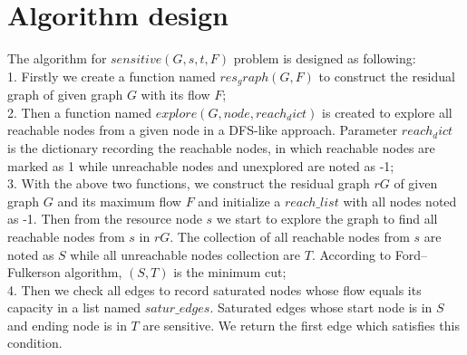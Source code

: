 \documentclass[a4paper,11pt]{article}
\begin{document}
\section{Algorithm design}

The algorithm for $sensitive(G,s,t,F)$ problem is designed as following:  \\
1. Firstly we create a function named $res_graph(G, F)$ to construct the residual graph of given graph $G$ with its flow $F$;\\

2. Then a function named $explore(G, node, reach_dict)$ is created to explore all reachable nodes from a given node in a DFS-like approach. Parameter $reach_dict$ is the dictionary recording the reachable nodes, in which reachable nodes are marked as 1 while unreachable nodes and unexplored are noted as -1;\\

3. With the above two functions, we construct the residual graph $rG$ of given graph $G$ and its maximum flow $F$ and initialize a $reach\_list$ with all nodes noted as -1. Then from the resource node $s$ we start to explore the graph to find all reachable nodes from $s$ in $rG$. The collection of all reachable nodes from $s$ are noted as $S$ while all unreachable nodes collection are $T$. According to Ford–Fulkerson algorithm, $(S, T)$ is the minimum cut; \\

4. Then we check all edges to record saturated nodes whose flow equals its capacity in a list named $satur\_edges$. Saturated edges whose start node is in $S$ and ending node is in $T$ are sensitive. We return the first edge which satisfies this condition. 
\end{document}
